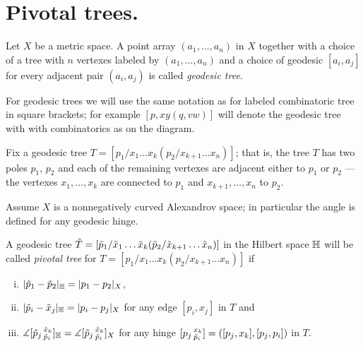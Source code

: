 \section{Pivotal trees.}

Let $X$ be a metric space.
A point array $(a_1,\dots,a_n)$ in $X$ together with a choice of a tree with $n$ vertexes labeled by  $(a_1,\dots,a_n)$ and a choice of geodesic $[a_i,a_j]$ for every adjacent pair $(a_i,a_j)$ is called \emph{geodesic tree}.

\hide
\begin{wrapfigure}{r}{27 mm}
\end{wrapfigure}
\unhide

For geodesic trees we will use the same notation as for labeled combinatoric tree in square brackets; for example $[p,xy(q,vw)]$ will denote the geodesic tree with with combinatorics as on the diagram. 

Fix a geodesic tree $T=[p_1/x_1\dots x_k(p_2/x_{k+1}\dots x_n)]$;
that is, the tree $T$ has two poles $p_1$, $p_2$ and each of the remaining vertexes are adjacent either to $p_1$ or $p_2$ --- the vertexes $x_1,\dots, x_k$ are connected to $p_1$ and $x_{k+1},\dots, x_n$ to $p_2$.

Assume $X$ is a nonnegatively curved Alexandrov space;
in particular the angle is defined for any geodesic hinge. 

A geodesic tree  $\~T=[\~p_1/\~x_1\dots \~x_k(\~p_2/\~x_{k+1}\dots \~x_n)]$ in the Hilbert space $\HH$ will be called \emph{pivotal tree} for $T=[p_1/x_1\dots x_k(p_2/x_{k+1}\dots x_n)]$
if 
\begin{enumerate}[(i)]
\item $|\~p_1-\~p_2|_\HH= |p_1-p_2|_X$,
\item $|\~p_i-\~x_j|_\HH= |p_i-p_j|_X$ for any edge $[p_i,x_j]$ in $T$ and
\item $\measuredangle[\~p_j\,^{\~x_k}_{\~p_i}]_{\HH}=\measuredangle[\~p_j\,^{\~x_k}_{\~p_i}]_X$
for any hinge  $[p_j\,^{x_k}_{\~p_i}]=([p_j,x_k],[p_j,p_i])$ in $T$.
\end{enumerate}


